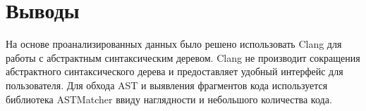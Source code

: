 \section{Выводы}
На основе проанализированных данных было решено использовать Clang для работы с абстрактным синтаксическим
деревом. Clang не производит сокращения абстрактного синтаксического дерева и предоставляет удобный интерфейс для
пользователя. Для обхода AST и выявления фрагментов кода используется библиотека ASTMatcher ввиду наглядности
и небольшого количества кода.
